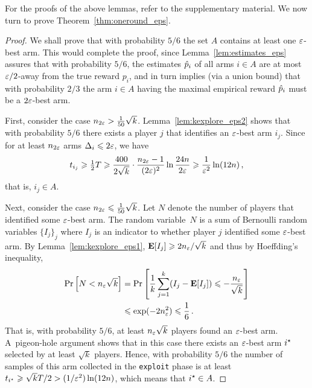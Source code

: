 For the proofs of the above lemmas, refer to the supplementary material.
We now turn to prove Theorem~\ref{thm:oneround_eps}.



\begin{proof}
We shall prove that with probability $5/6$ the set $A$ contains at least one $\varepsilon$-best arm.
This would complete the proof, since Lemma~\ref{lem:estimates_eps} assures that with probability $5/6$, the estimates $\hat{p}_i$ of all arms $i \in A$ are at most $\varepsilon/2$-away from the true reward $p_i$, and in turn implies (via a union bound) that with probability $2/3$ the arm $i \in A$ having the maximal empirical reward $\hat{p}_i$ must be a $2\varepsilon$-best arm.

First, consider the case $n_{2\varepsilon} > \tfrac{1}{50}\sqrt{k}$. Lemma~\ref{lem:kexplore_eps2} shows that with probability $5/6$ there exists a player $j$ that identifies an $\varepsilon$-best arm $i_j$.
Since for at least $n_{2\varepsilon}$ arms $\Delta_i \leqslant 2\varepsilon$, we have
\begin{align*}
	t_{i_j} 
	\geqslant \tfrac{1}{2} T
	\geqslant \frac{400}{2\sqrt{k}} \cdot \frac{n_{2\varepsilon}-1}{(2\varepsilon)^2} \ln \frac {24n}{2\varepsilon}
	\geqslant \frac{1}{\varepsilon^2} \ln (12n) \,,
\end{align*}
that is, $i_j \in A$.

Next, consider the case $n_{2\varepsilon} \leqslant \tfrac{1}{50}\sqrt{k}$.
Let $N$ denote the number of players that identified some $\varepsilon$-best arm.
The random variable~$N$ is a sum of Bernoulli random variables $\{I_j\}_j$ where $I_j$ is an indicator to whether player $j$ identified some $\varepsilon$-best arm. By Lemma~\ref{lem:kexplore_eps1}, $\mathbf{E}[I_j]\geqslant 2 n_{\varepsilon} / \sqrt{k}$ and thus by Hoeffding's inequality,
\begin{align*}
	\Pr\left[N < n_{\varepsilon} \sqrt{k}\right] 
	&= \Pr\left[ \frac{1}{k} \sum_{j=1}^k (I_j-\mathbf{E}[I_j]) \leqslant -\frac{n_\varepsilon}{\sqrt{k}} \right] \\
	&\leqslant \exp(-2 n_{\varepsilon}^2)
	\leqslant \frac{1}{6} \,.
\end{align*}
That is, with probability $5/6$, at least $n_{\varepsilon} \sqrt{k}$ players found an $\varepsilon$-best arm. 
A~pigeon-hole argument shows that in this case there exists an $\varepsilon$-best arm $i^\star$ selected by at least $\sqrt{k}$ players.
Hence, with probability $5/6$ the number of samples of this arm collected in the \texttt{exploit} phase is at least $t_{i^\star} \geqslant \sqrt{k} T/2 > (1/\varepsilon^2) \ln(12n)$, which means that $i^\star \in A$.
\end{proof}

